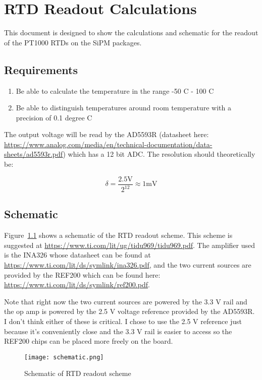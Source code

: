 \documentclass[12pt,openright,twoside]{report}
\begin{document}
\chapter{RTD Readout Calculations}
\label{appendix:rtd}
This document is designed to show the calculations and schematic for the readout of the PT1000 RTDs on the SiPM packages.
\section{Requirements}
\begin{enumerate}
\item Be able to calculate the temperature in the range -50 C - 100 C
\item Be able to distinguish temperatures around room temperature with a precision of 0.1 degree C
\end{enumerate}
The output voltage will be read by the AD5593R (datasheet here:
\url{https://www.analog.com/media/en/technical-documentation/data-sheets/ad5593r.pdf})
which has a 12 bit ADC. The resolution should theoretically be:

\begin{equation}
\delta = \frac{2.5 \mathrm{V}}{2^{12}} \approx 1 \mathrm{mV}
\end{equation}
\section{Schematic}
Figure~\ref{schematic} shows a schematic of the RTD readout scheme. This scheme
is suggested at \url{https://www.ti.com/lit/ug/tidu969/tidu969.pdf}. The
amplifier used is the INA326 whose datasheet can be found at
\url{https://www.ti.com/lit/ds/symlink/ina326.pdf}, and the two current sources
are provided by the REF200 which can be found here:
\url{https://www.ti.com/lit/ds/symlink/ref200.pdf}.

Note that right now the two current sources are powered by the 3.3 V rail and
the op amp is powered by the 2.5 V voltage reference provided by the AD5593R. I
don't think either of these is critical. I chose to use the 2.5 V reference
just because it's conveniently close and the 3.3 V rail is easier to access so
the REF200 chips can be placed more freely on the board.

\begin{figure}[!ht]
\centering
\texttt{[image: schematic.png]}
\caption{Schematic of RTD readout scheme}
\label{schematic}
\end{figure}
\end{document}
